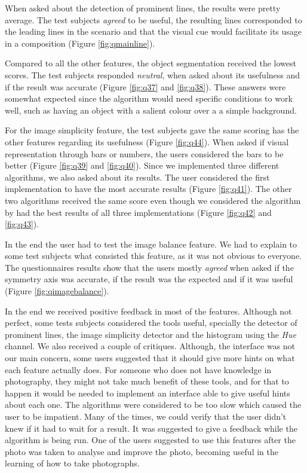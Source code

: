When asked about the detection of prominent lines, the results were pretty average. The test subjects \emph{agreed} to be useful, the resulting lines corresponded to the leading lines in the scenario and that the visual cue would facilitate its usage in a composition (Figure \ref{fig:qmainline}).

Compared to all the other features, the object segmentation received the lowest scores. The test subjects responded \emph{neutral}, when asked about its usefulness and if the result was accurate (Figure \ref{fig:q37} and \ref{fig:q38}). These answers were somewhat expected since the algorithm would need specific conditions to work well, such as having an object with a salient colour over a a simple background.

For the image simplicity feature, the test subjects gave the same scoring has the other features regarding its usefulness (Figure \ref{fig:q44}). When asked if visual representation through bars or numbers, the users considered the bars to be better (Figure \ref{fig:q39} and \ref{fig:q40}). Since we implemented three different algorithms, we also asked about its results. The user considered the first implementation \cite{luo2008photo} to have the most accurate results (Figure \ref{fig:q41}). The other two algorithms \cite{kaoautomatic,ke2006design} received the same score even though we considered the algorithm by \citeauthor{ke2006design} \cite{ke2006design} had the best results of all three implementations (Figure \ref{fig:q42} and \ref{fig:q43}).

In the end the user had to test the image balance feature. We had to explain to some test subjects what consisted this feature, as it was not obvious to everyone. The questionnaires results show that the users mostly \emph{agreed} when asked if the symmetry axis was accurate, if the result was the expected and if it was useful (Figure \ref{fig:qimagebalance}).

In the end we received positive feedback in most of the features. Although not perfect, some tests subjects considered the tools useful, specially the detector of prominent lines, the image simplicity detector and the histogram using the \emph{Hue} channel.
We also received a couple of critiques. Although, the interface was not our main concern, some users suggested that it should give more hints on what each feature actually does. For someone who does not have knowledge in photography, they might not take much benefit of these tools, and for that to happen it would be needed to implement an interface able to give useful hints about each one. The algorithms were considered to be too slow which caused the user to be impatient. Many of the times, we could verify that the user didn't knew if it had to wait for a result. It was suggested to give a feedback while the algorithm is being run.
One of the users suggested to use this features after the photo was taken to analyse and improve the photo, becoming useful in the learning of how to take photographs.